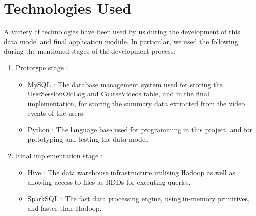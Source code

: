 \documentclass[16pt]{report}
\begin{document}
\section{Technologies Used}

A variety of technologies have been used by us during the development of this data model and final application module. In particular, we used the following during the mentioned stages of the development process:

\begin{enumerate}

\item Prototype stage	:

\begin{itemize}

\item MySQL		:	The database management system used for storing the UserSessionOldLog and CourseVideos table, and in the final implementation, for storing the summary data extracted from the video events of the users.

\item Python		:	The language base used for programming in this project, and for prototyping and testing the data model.

\end{itemize}

\item Final implementation stage	:

\begin{itemize}

\item Hive		:	The data warehouse infrastructure utilising Hadoop as well as allowing access to files as RDDs for executing queries.

\item SparkSQL	:	The fast data processing engine, using in-memory primitives, and faster than Hadoop.

\end{itemize}

\end{enumerate}
\end{document}
